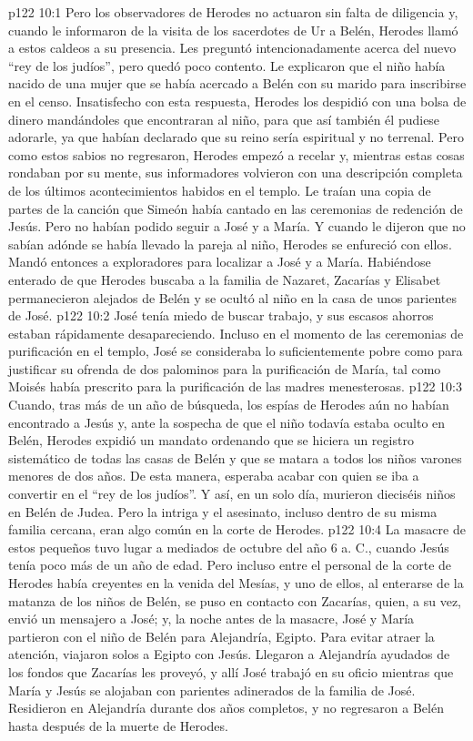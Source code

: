\vs p122 10:1 Pero los observadores de Herodes no actuaron sin falta de diligencia y, cuando le informaron de la visita de los sacerdotes de Ur a Belén, Herodes llamó a estos caldeos a su presencia. Les preguntó intencionadamente acerca del nuevo “rey de los judíos”, pero quedó poco contento. Le explicaron que el niño había nacido de una mujer que se había acercado a Belén con su marido para inscribirse en el censo. Insatisfecho con esta respuesta, Herodes los despidió con una bolsa de dinero mandándoles que encontraran al niño, para que así también él pudiese adorarle, ya que habían declarado que su reino sería espiritual y no terrenal. Pero como estos sabios no regresaron, Herodes empezó a recelar y, mientras estas cosas rondaban por su mente, sus informadores volvieron con una descripción completa de los últimos acontecimientos habidos en el templo. Le traían una copia de partes de la canción que Simeón había cantado en las ceremonias de redención de Jesús. Pero no habían podido seguir a José y a María. Y cuando le dijeron que no sabían adónde se había llevado la pareja al niño, Herodes se enfureció con ellos. Mandó entonces a exploradores para localizar a José y a María. Habiéndose enterado de que Herodes buscaba a la familia de Nazaret, Zacarías y Elisabet permanecieron alejados de Belén y se ocultó al niño en la casa de unos parientes de José.
\vs p122 10:2 José tenía miedo de buscar trabajo, y sus escasos ahorros estaban rápidamente desapareciendo. Incluso en el momento de las ceremonias de purificación en el templo, José se consideraba lo suficientemente pobre como para justificar su ofrenda de dos palominos para la purificación de María, tal como Moisés había prescrito para la purificación de las madres menesterosas.
\vs p122 10:3 Cuando, tras más de un año de búsqueda, los espías de Herodes aún no habían encontrado a Jesús y, ante la sospecha de que el niño todavía estaba oculto en Belén, Herodes expidió un mandato ordenando que se hiciera un registro sistemático de todas las casas de Belén y que se matara a todos los niños varones menores de dos años. De esta manera, esperaba acabar con quien se iba a convertir en el “rey de los judíos”. Y así, en un solo día, murieron dieciséis niños en Belén de Judea. Pero la intriga y el asesinato, incluso dentro de su misma familia cercana, eran algo común en la corte de Herodes.
\vs p122 10:4 La masacre de estos pequeños tuvo lugar a mediados de octubre del año 6 a. C., cuando Jesús tenía poco más de un año de edad. Pero incluso entre el personal de la corte de Herodes había creyentes en la venida del Mesías, y uno de ellos, al enterarse de la matanza de los niños de Belén, se puso en contacto con Zacarías, quien, a su vez, envió un mensajero a José; y, la noche antes de la masacre, José y María partieron con el niño de Belén para Alejandría, Egipto. Para evitar atraer la atención, viajaron solos a Egipto con Jesús. Llegaron a Alejandría ayudados de los fondos que Zacarías les proveyó, y allí José trabajó en su oficio mientras que María y Jesús se alojaban con parientes adinerados de la familia de José. Residieron en Alejandría durante dos años completos, y no regresaron a Belén hasta después de la muerte de Herodes.
